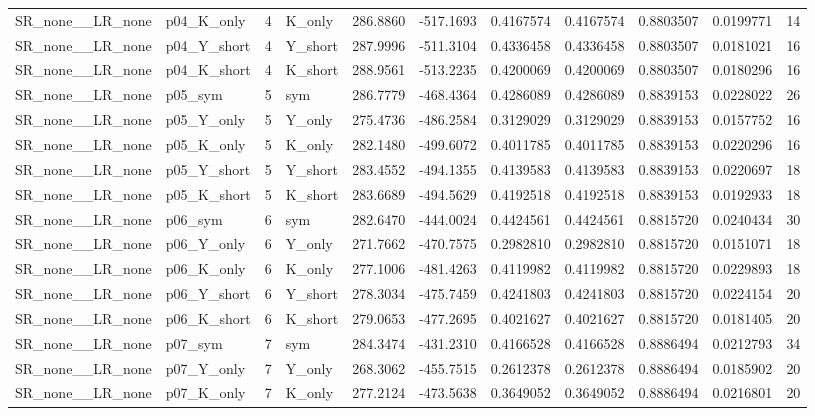 \begin{table}[!h]
\begin{tabular}[t]{llrlrrrrrrr}
SR\_none\_\_LR\_none & p04\_K\_only & 4 & K\_only & 286.8860 & -517.1693 & 0.4167574 & 0.4167574 & 0.8803507 & 0.0199771 & 14\\
SR\_none\_\_LR\_none & p04\_Y\_short & 4 & Y\_short & 287.9996 & -511.3104 & 0.4336458 & 0.4336458 & 0.8803507 & 0.0181021 & 16\\
SR\_none\_\_LR\_none & p04\_K\_short & 4 & K\_short & 288.9561 & -513.2235 & 0.4200069 & 0.4200069 & 0.8803507 & 0.0180296 & 16\\
\addlinespace
SR\_none\_\_LR\_none & p05\_sym & 5 & sym & 286.7779 & -468.4364 & 0.4286089 & 0.4286089 & 0.8839153 & 0.0228022 & 26\\
SR\_none\_\_LR\_none & p05\_Y\_only & 5 & Y\_only & 275.4736 & -486.2584 & 0.3129029 & 0.3129029 & 0.8839153 & 0.0157752 & 16\\
SR\_none\_\_LR\_none & p05\_K\_only & 5 & K\_only & 282.1480 & -499.6072 & 0.4011785 & 0.4011785 & 0.8839153 & 0.0220296 & 16\\
SR\_none\_\_LR\_none & p05\_Y\_short & 5 & Y\_short & 283.4552 & -494.1355 & 0.4139583 & 0.4139583 & 0.8839153 & 0.0220697 & 18\\
SR\_none\_\_LR\_none & p05\_K\_short & 5 & K\_short & 283.6689 & -494.5629 & 0.4192518 & 0.4192518 & 0.8839153 & 0.0192933 & 18\\
\addlinespace
SR\_none\_\_LR\_none & p06\_sym & 6 & sym & 282.6470 & -444.0024 & 0.4424561 & 0.4424561 & 0.8815720 & 0.0240434 & 30\\
SR\_none\_\_LR\_none & p06\_Y\_only & 6 & Y\_only & 271.7662 & -470.7575 & 0.2982810 & 0.2982810 & 0.8815720 & 0.0151071 & 18\\
SR\_none\_\_LR\_none & p06\_K\_only & 6 & K\_only & 277.1006 & -481.4263 & 0.4119982 & 0.4119982 & 0.8815720 & 0.0229893 & 18\\
SR\_none\_\_LR\_none & p06\_Y\_short & 6 & Y\_short & 278.3034 & -475.7459 & 0.4241803 & 0.4241803 & 0.8815720 & 0.0224154 & 20\\
SR\_none\_\_LR\_none & p06\_K\_short & 6 & K\_short & 279.0653 & -477.2695 & 0.4021627 & 0.4021627 & 0.8815720 & 0.0181405 & 20\\
\addlinespace
SR\_none\_\_LR\_none & p07\_sym & 7 & sym & 284.3474 & -431.2310 & 0.4166528 & 0.4166528 & 0.8886494 & 0.0212793 & 34\\
SR\_none\_\_LR\_none & p07\_Y\_only & 7 & Y\_only & 268.3062 & -455.7515 & 0.2612378 & 0.2612378 & 0.8886494 & 0.0185902 & 20\\
SR\_none\_\_LR\_none & p07\_K\_only & 7 & K\_only & 277.2124 & -473.5638 & 0.3649052 & 0.3649052 & 0.8886494 & 0.0216801 & 20\\

\end{tabular}
\end{table}
